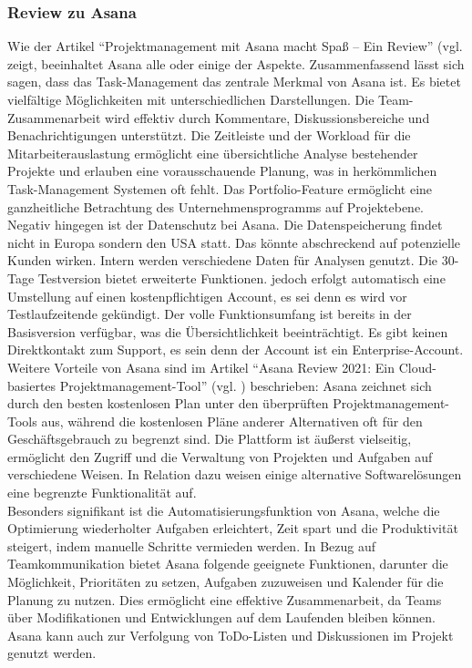 \documentclass[sigconf, nonacm]{acmart}
\begin{document}
\subsubsection{Review zu Asana}
Wie der Artikel \enquote{Projektmanagement mit Asana macht Spaß – Ein Review} (vgl. \cite{venzmer_projektmanagement_2020} zeigt, beeinhaltet Asana alle oder einige der Aspekte. Zusammenfassend lässt sich sagen, dass das Task-Management das zentrale Merkmal von Asana ist. Es bietet vielfältige Möglichkeiten mit unterschiedlichen Darstellungen. Die Team-Zusammenarbeit wird effektiv durch Kommentare, Diskussionsbereiche und Benachrichtigungen unterstützt. Die Zeitleiste und der Workload für die Mitarbeiterauslastung ermöglicht eine übersichtliche Analyse bestehender Projekte und erlauben eine vorausschauende Planung, was in herkömmlichen Task-Management Systemen oft fehlt. Das Portfolio-Feature ermöglicht eine ganzheitliche Betrachtung des Unternehmensprogramms auf Projektebene.
Negativ hingegen ist der Datenschutz bei Asana. Die Datenspeicherung findet nicht in Europa sondern den USA statt. Das könnte abschreckend auf potenzielle Kunden wirken. Intern werden verschiedene Daten für Analysen genutzt. Die 30-Tage Testversion bietet erweiterte Funktionen. jedoch erfolgt automatisch eine Umstellung auf einen kostenpflichtigen Account, es sei denn es wird vor Testlaufzeitende gekündigt. Der volle Funktionsumfang ist bereits in der Basisversion verfügbar, was die Übersichtlichkeit beeinträchtigt. Es gibt keinen Direktkontakt zum Support, es sein denn der Account ist ein Enterprise-Account.\\
Weitere Vorteile von Asana sind im Artikel \enquote{Asana Review 2021: Ein Cloud-basiertes Projektmanagement-Tool} (vgl. \cite{noauthor_asana_nodate}) beschrieben:
Asana zeichnet sich durch den besten kostenlosen Plan unter den überprüften Projektmanagement-Tools aus, während die kostenlosen Pläne anderer Alternativen oft für den Geschäftsgebrauch zu begrenzt sind. Die Plattform ist äußerst vielseitig, ermöglicht den Zugriff und die Verwaltung von Projekten und Aufgaben auf verschiedene Weisen. In Relation dazu weisen einige alternative Softwarelösungen eine begrenzte Funktionalität auf.\\
Besonders signifikant ist die Automatisierungsfunktion von Asana, welche die Optimierung wiederholter Aufgaben erleichtert, Zeit spart und die Produktivität steigert, indem manuelle Schritte vermieden werden.
In Bezug auf Teamkommunikation bietet Asana folgende geeignete Funktionen, darunter die Möglichkeit, Prioritäten zu setzen, Aufgaben zuzuweisen und Kalender für die Planung zu nutzen. Dies ermöglicht eine effektive Zusammenarbeit, da Teams über Modifikationen und Entwicklungen auf dem Laufenden bleiben können. Asana kann auch zur Verfolgung von ToDo-Listen und Diskussionen im Projekt genutzt werden.
\end{document}
